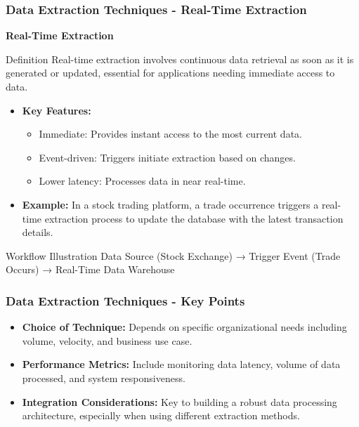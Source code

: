 \documentclass[aspectratio=169]{beamer}
\begin{document}
\begin{frame}[fragile]
    \frametitle{Data Extraction Techniques - Real-Time Extraction}
    \textbf{Real-Time Extraction}
    
    \begin{block}{Definition}
        Real-time extraction involves continuous data retrieval as soon as it is generated or updated, essential for applications needing immediate access to data.
    \end{block}
    
    \begin{itemize}
        \item \textbf{Key Features:}
        \begin{itemize}
            \item Immediate: Provides instant access to the most current data.
            \item Event-driven: Triggers initiate extraction based on changes.
            \item Lower latency: Processes data in near real-time.
        \end{itemize}
        \item \textbf{Example:}
            In a stock trading platform, a trade occurrence triggers a real-time extraction process to update the database with the latest transaction details.
    \end{itemize}
    
    \begin{block}{Workflow Illustration}
        Data Source (Stock Exchange) → Trigger Event (Trade Occurs) → Real-Time Data Warehouse
    \end{block}
\end{frame}

\begin{frame}[fragile]
    \frametitle{Data Extraction Techniques - Key Points}
    \begin{itemize}
        \item \textbf{Choice of Technique:} Depends on specific organizational needs including volume, velocity, and business use case.
        \item \textbf{Performance Metrics:} Include monitoring data latency, volume of data processed, and system responsiveness.
        \item \textbf{Integration Considerations:} Key to building a robust data processing architecture, especially when using different extraction methods.
    \end{itemize}
\end{frame}
\end{document}
